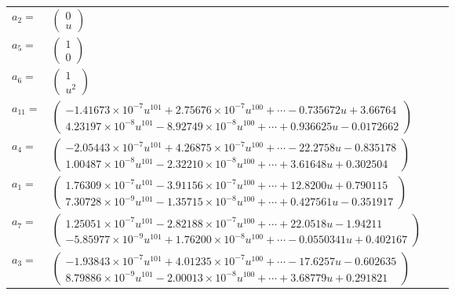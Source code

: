 \documentclass[1p]{elsarticle_modified}
\theoremstyle{definition}
\begin{document}
\begin{tabular}{m{7pt} m{180pt} m{7pt} m{180pt} }
\flushright $a_{2}=$&$\begin{pmatrix}0\\u\end{pmatrix}$ \\
\flushright $a_{5}=$&$\begin{pmatrix}1\\0\end{pmatrix}$ \\
\flushright $a_{6}=$&$\begin{pmatrix}1\\u^2\end{pmatrix}$ \\
\flushright $a_{11}=$&$\begin{pmatrix}-1.41673\times10^{-7} u^{101}+2.75676\times10^{-7} u^{100}+\cdots-0.735672 u+3.66764\\4.23197\times10^{-8} u^{101}-8.92749\times10^{-8} u^{100}+\cdots+0.936625 u-0.0172662\end{pmatrix}$ \\
\flushright $a_{4}=$&$\begin{pmatrix}-2.05443\times10^{-7} u^{101}+4.26875\times10^{-7} u^{100}+\cdots-22.2758 u-0.835178\\1.00487\times10^{-8} u^{101}-2.32210\times10^{-8} u^{100}+\cdots+3.61648 u+0.302504\end{pmatrix}$ \\
\flushright $a_{1}=$&$\begin{pmatrix}1.76309\times10^{-7} u^{101}-3.91156\times10^{-7} u^{100}+\cdots+12.8200 u+0.790115\\7.30728\times10^{-9} u^{101}-1.35715\times10^{-8} u^{100}+\cdots+0.427561 u-0.351917\end{pmatrix}$ \\
\flushright $a_{7}=$&$\begin{pmatrix}1.25051\times10^{-7} u^{101}-2.82188\times10^{-7} u^{100}+\cdots+22.0518 u-1.94211\\-5.85977\times10^{-9} u^{101}+1.76200\times10^{-8} u^{100}+\cdots-0.0550341 u+0.402167\end{pmatrix}$ \\
\flushright $a_{3}=$&$\begin{pmatrix}-1.93843\times10^{-7} u^{101}+4.01235\times10^{-7} u^{100}+\cdots-17.6257 u-0.602635\\8.79886\times10^{-9} u^{101}-2.00013\times10^{-8} u^{100}+\cdots+3.68779 u+0.291821\end{pmatrix}$ \\

\end{tabular}
\end{document}
